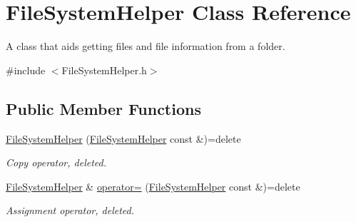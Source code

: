 \hypertarget{class_file_system_helper}{}\section{File\+System\+Helper Class Reference}
\label{class_file_system_helper}


A class that aids getting files and file information from a folder.  




{\ttfamily \#include $<$File\+System\+Helper.\+h$>$}

\subsection*{Public Member Functions}
\begin{DoxyCompactItemize}
\item 
\mbox{\label{class_file_system_helper_a73abde918c6cff15b8b86b1758b07366}} 
\mbox{\hyperlink{class_file_system_helper_a73abde918c6cff15b8b86b1758b07366}{File\+System\+Helper}} (\mbox{\hyperlink{class_file_system_helper}{File\+System\+Helper}} const \&)=delete
\begin{DoxyCompactList}\small\item\em Copy operator, deleted. \end{DoxyCompactList}\item 
\mbox{\label{class_file_system_helper_a0aafa11c68662b143c51ad8414ff2980}} 
\mbox{\hyperlink{class_file_system_helper}{File\+System\+Helper}} \& \mbox{\hyperlink{class_file_system_helper_a0aafa11c68662b143c51ad8414ff2980}{operator=}} (\mbox{\hyperlink{class_file_system_helper}{File\+System\+Helper}} const \&)=delete
\begin{DoxyCompactList}\small\item\em Assignment operator, deleted. \end{DoxyCompactList}\end{DoxyCompactItemize}
